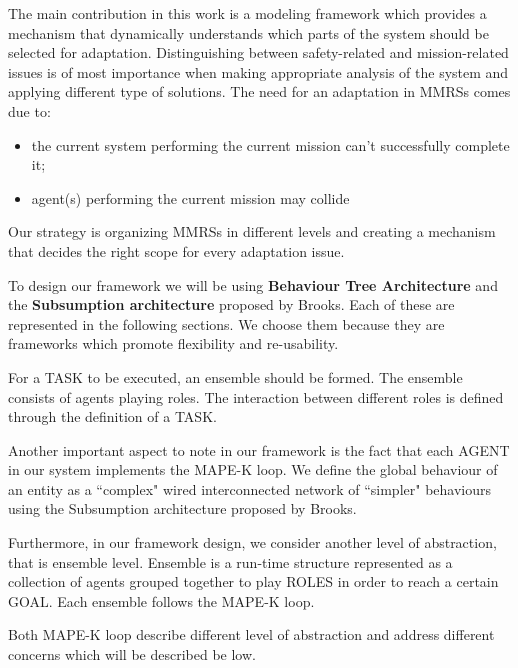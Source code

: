 \documentclass[journal]{IEEEtran}
\theoremstyle{definition}
\newcommand\darko[1]{\nb{Darko}{#1}}
\newcommand\patrizio[1]{\nb{Patrizio}{#1}}
\begin{document}
The main contribution in this work is a modeling framework which  provides a mechanism that dynamically  understands  which  parts  of the  system  should be  selected  for adaptation. Distinguishing between safety-related and mission-related issues is of most importance when making appropriate analysis of the system and applying different type of solutions.  The need for an adaptation in MMRSs comes due to:
\begin{itemize}
\item the current system performing the current mission can’t successfully complete it;
\item  agent(s) performing the current mission may collide 
\end{itemize}
Our  strategy  is  organizing  MMRSs  in  different  levels  and  creating  a  mechanism  that  decides  the  right  scope  for  every adaptation issue.

\darko{FINISH READING}
To design our framework we will be using  \textbf{Behaviour Tree Architecture} and the \textbf{Subsumption architecture} proposed by Brooks. Each of these are represented in the following sections. We choose them because they are frameworks which promote flexibility and re-usability. 

For a TASK to be executed, an ensemble should be formed. 
The ensemble consists of agents playing roles. The interaction between different roles is defined through the definition of a TASK.





Another important aspect to note in our framework is the fact that each AGENT in our system implements the MAPE-K loop. We define the global behaviour of an entity as a ``complex" wired interconnected network of ``simpler" behaviours using the {Subsumption architecture} proposed by Brooks. 

Furthermore, in our framework design, we consider another level of abstraction, that is ensemble level. Ensemble is  a  run-time  structure  represented  as  a  collection of agents grouped together to play ROLES in order to reach a certain GOAL. Each ensemble follows the MAPE-K loop. 

Both MAPE-K loop describe different level of abstraction and address different concerns which will be described be low.
\end{document}
